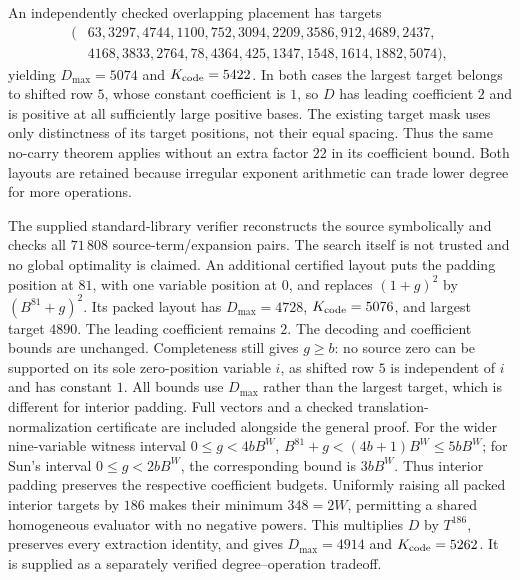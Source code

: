 An independently checked overlapping placement has targets
\[
\begin{split}
(&63,3297,4744,1100,752,3094,2209,3586,912,4689,2437,\\
 &4168,3833,2764,78,4364,425,1347,1548,1614,1882,5074),
\end{split}
\]
yielding $D_{\max}=5074$ and $K_{\rm code}=5422$.
In both cases the largest target belongs to shifted row $5$, whose constant
coefficient is $1$, so $D$ has leading coefficient $2$ and is positive at
all sufficiently large positive bases. The existing target mask uses only
distinctness of its target positions, not their equal spacing. Thus the
same no-carry theorem applies without an extra factor $22$ in its
coefficient bound. Both layouts are retained because irregular exponent
arithmetic can trade lower degree for more operations.

The supplied standard-library verifier reconstructs the source symbolically
and checks all $71\,808$ source-term/expansion pairs. The search itself is
not trusted and no global optimality is claimed. An additional certified layout puts the padding position at $81$, with
one variable position at $0$, and replaces $(1+g)^2$ by $(B^{81}+g)^2$.
Its packed layout has $D_{\max}=4728$, $K_{\rm code}=5076$, and largest
target $4890$. The leading coefficient remains $2$. The decoding and
coefficient bounds are unchanged. Completeness still gives $g\ge b$:
no source zero can be supported on its sole zero-position variable $i$,
as shifted row $5$ is independent of $i$ and has constant $1$.
All bounds use $D_{\max}$ rather than the largest target, which is different
for interior padding. Full vectors and a checked translation-normalization
certificate are included alongside the general proof.
For the wider nine-variable witness interval $0\le g<4bB^W$,
$B^{81}+g<(4b+1)B^W\le5bB^W$; for Sun's interval
$0\le g<2bB^W$, the corresponding bound is $3bB^W$.
Thus interior padding preserves the respective coefficient budgets.
Uniformly raising all packed interior targets by $186$ makes their minimum
$348=2W$, permitting a shared homogeneous evaluator with no negative powers.
This multiplies $D$ by $T^{186}$, preserves every extraction identity, and
gives $D_{\max}=4914$ and $K_{\rm code}=5262$. It is supplied as a separately
verified degree--operation tradeoff.
